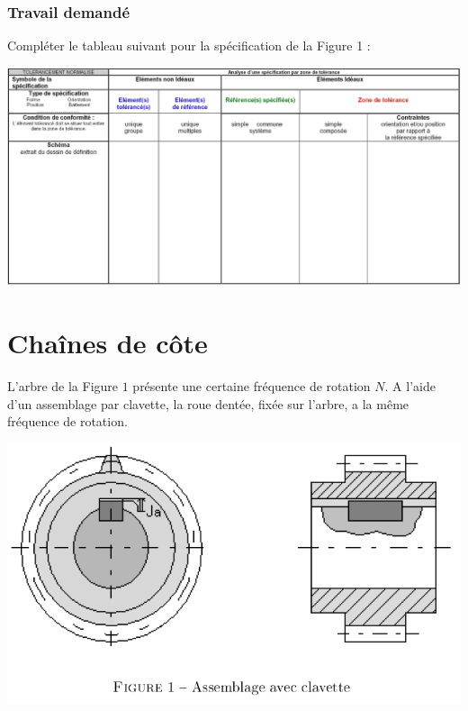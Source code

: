 \subsubsection{Travail demandé}
Compléter le tableau suivant pour la spécification de la Figure 1 :
\begin{center}
    \includegraphics[scale=0.65]{png/doc_rep.png}
\end{center}

\newpage


\section{Chaînes de côte}

L'arbre de la Figure $1$ présente une certaine fréquence de rotation $N$. A
l'aide d'un assemblage par clavette, la roue dentée, fixée sur l'arbre, a la même fréquence de rotation.

\begin{center}
\includegraphics[scale=0.5]{png/clavette.png}
\end{center}

